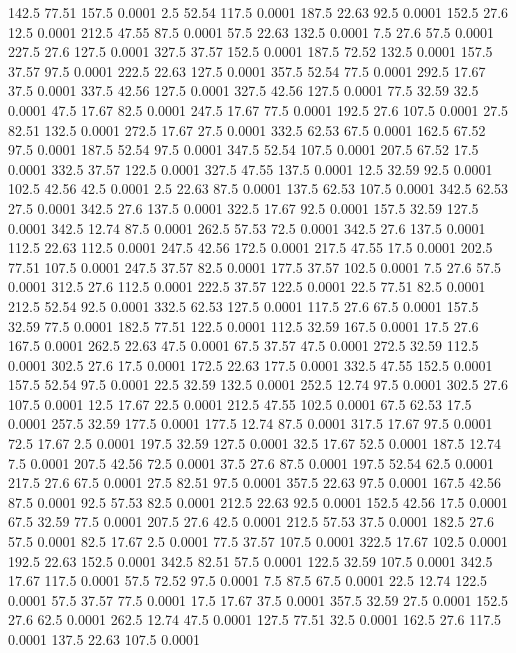 142.5	77.51	157.5	0.0001
2.5	52.54	117.5	0.0001
187.5	22.63	92.5	0.0001
152.5	27.6	12.5	0.0001
212.5	47.55	87.5	0.0001
57.5	22.63	132.5	0.0001
7.5	27.6	57.5	0.0001
227.5	27.6	127.5	0.0001
327.5	37.57	152.5	0.0001
187.5	72.52	132.5	0.0001
157.5	37.57	97.5	0.0001
222.5	22.63	127.5	0.0001
357.5	52.54	77.5	0.0001
292.5	17.67	37.5	0.0001
337.5	42.56	127.5	0.0001
327.5	42.56	127.5	0.0001
77.5	32.59	32.5	0.0001
47.5	17.67	82.5	0.0001
247.5	17.67	77.5	0.0001
192.5	27.6	107.5	0.0001
27.5	82.51	132.5	0.0001
272.5	17.67	27.5	0.0001
332.5	62.53	67.5	0.0001
162.5	67.52	97.5	0.0001
187.5	52.54	97.5	0.0001
347.5	52.54	107.5	0.0001
207.5	67.52	17.5	0.0001
332.5	37.57	122.5	0.0001
327.5	47.55	137.5	0.0001
12.5	32.59	92.5	0.0001
102.5	42.56	42.5	0.0001
2.5	22.63	87.5	0.0001
137.5	62.53	107.5	0.0001
342.5	62.53	27.5	0.0001
342.5	27.6	137.5	0.0001
322.5	17.67	92.5	0.0001
157.5	32.59	127.5	0.0001
342.5	12.74	87.5	0.0001
262.5	57.53	72.5	0.0001
342.5	27.6	137.5	0.0001
112.5	22.63	112.5	0.0001
247.5	42.56	172.5	0.0001
217.5	47.55	17.5	0.0001
202.5	77.51	107.5	0.0001
247.5	37.57	82.5	0.0001
177.5	37.57	102.5	0.0001
7.5	27.6	57.5	0.0001
312.5	27.6	112.5	0.0001
222.5	37.57	122.5	0.0001
22.5	77.51	82.5	0.0001
212.5	52.54	92.5	0.0001
332.5	62.53	127.5	0.0001
117.5	27.6	67.5	0.0001
157.5	32.59	77.5	0.0001
182.5	77.51	122.5	0.0001
112.5	32.59	167.5	0.0001
17.5	27.6	167.5	0.0001
262.5	22.63	47.5	0.0001
67.5	37.57	47.5	0.0001
272.5	32.59	112.5	0.0001
302.5	27.6	17.5	0.0001
172.5	22.63	177.5	0.0001
332.5	47.55	152.5	0.0001
157.5	52.54	97.5	0.0001
22.5	32.59	132.5	0.0001
252.5	12.74	97.5	0.0001
302.5	27.6	107.5	0.0001
12.5	17.67	22.5	0.0001
212.5	47.55	102.5	0.0001
67.5	62.53	17.5	0.0001
257.5	32.59	177.5	0.0001
177.5	12.74	87.5	0.0001
317.5	17.67	97.5	0.0001
72.5	17.67	2.5	0.0001
197.5	32.59	127.5	0.0001
32.5	17.67	52.5	0.0001
187.5	12.74	7.5	0.0001
207.5	42.56	72.5	0.0001
37.5	27.6	87.5	0.0001
197.5	52.54	62.5	0.0001
217.5	27.6	67.5	0.0001
27.5	82.51	97.5	0.0001
357.5	22.63	97.5	0.0001
167.5	42.56	87.5	0.0001
92.5	57.53	82.5	0.0001
212.5	22.63	92.5	0.0001
152.5	42.56	17.5	0.0001
67.5	32.59	77.5	0.0001
207.5	27.6	42.5	0.0001
212.5	57.53	37.5	0.0001
182.5	27.6	57.5	0.0001
82.5	17.67	2.5	0.0001
77.5	37.57	107.5	0.0001
322.5	17.67	102.5	0.0001
192.5	22.63	152.5	0.0001
342.5	82.51	57.5	0.0001
122.5	32.59	107.5	0.0001
342.5	17.67	117.5	0.0001
57.5	72.52	97.5	0.0001
7.5	87.5	67.5	0.0001
22.5	12.74	122.5	0.0001
57.5	37.57	77.5	0.0001
17.5	17.67	37.5	0.0001
357.5	32.59	27.5	0.0001
152.5	27.6	62.5	0.0001
262.5	12.74	47.5	0.0001
127.5	77.51	32.5	0.0001
162.5	27.6	117.5	0.0001
137.5	22.63	107.5	0.0001
